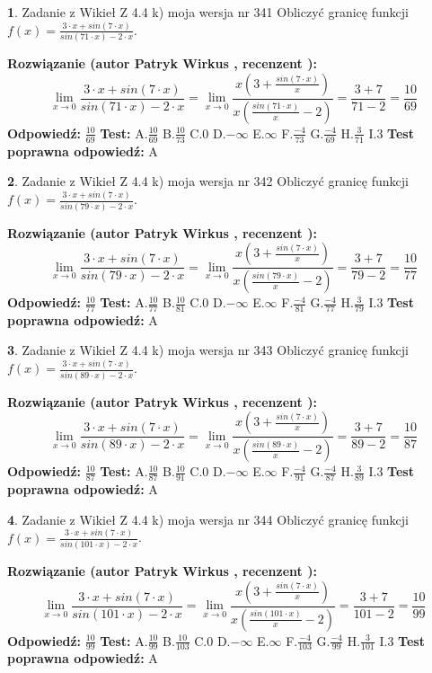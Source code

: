 \documentclass[12pt, a4paper]{article}
\theoremstyle{definition} %
\newtheorem{zad}{}
\newcommand{\zadStart}[1]{\begin{zad}#1\newline}
\newcommand{\zadStop}{\end{zad}}
\newcommand{\rozwStart}[2]{\noindent \textbf{Rozwiązanie (autor #1 , recenzent #2): }\newline}
\newcommand{\rozwStop}{\newline}
\newcommand{\odpStart}{\noindent \textbf{Odpowiedź:}\newline}
\newcommand{\odpStop}{\newline}
\newcommand{\testStart}{\noindent \textbf{Test:}\newline}
\newcommand{\testStop}{\newline}
\newcommand{\kluczStart}{\noindent \textbf{Test poprawna odpowiedź:}\newline}
\newcommand{\kluczStop}{\newline}
\begin{document}
\zadStart{Zadanie z Wikieł Z 4.4 k) moja wersja nr 341}
Obliczyć granicę funkcji $f(x)=\frac{3\cdot x +sin(7\cdot x)}{sin(71\cdot x) -2\cdot x}$.
\zadStop
\rozwStart{Patryk Wirkus}{}
$$\lim\limits_{x\to 0}\frac{3\cdot x +sin(7\cdot x)}{sin(71\cdot x) -2\cdot x}
=\lim\limits_{x\to 0}\frac{x(3+\frac{sin(7\cdot x)}{x})}{x(\frac{sin(71\cdot x)}{x}-2)}
=\frac{3+7}{71-2} = \frac{10}{69}$$
\rozwStop
\odpStart
$\frac{10}{69}$
\odpStop
\testStart
A.$\frac{10}{69}$
B.$\frac{10}{73}$
C.$0$
D.$-\infty$
E.$\infty$
F.$\frac{-4}{73}$
G.$\frac{-4}{69}$
H.$\frac{3}{71}$
I.$3$
\testStop
\kluczStart
A
\kluczStop



\zadStart{Zadanie z Wikieł Z 4.4 k) moja wersja nr 342}
Obliczyć granicę funkcji $f(x)=\frac{3\cdot x +sin(7\cdot x)}{sin(79\cdot x) -2\cdot x}$.
\zadStop
\rozwStart{Patryk Wirkus}{}
$$\lim\limits_{x\to 0}\frac{3\cdot x +sin(7\cdot x)}{sin(79\cdot x) -2\cdot x}
=\lim\limits_{x\to 0}\frac{x(3+\frac{sin(7\cdot x)}{x})}{x(\frac{sin(79\cdot x)}{x}-2)}
=\frac{3+7}{79-2} = \frac{10}{77}$$
\rozwStop
\odpStart
$\frac{10}{77}$
\odpStop
\testStart
A.$\frac{10}{77}$
B.$\frac{10}{81}$
C.$0$
D.$-\infty$
E.$\infty$
F.$\frac{-4}{81}$
G.$\frac{-4}{77}$
H.$\frac{3}{79}$
I.$3$
\testStop
\kluczStart
A
\kluczStop



\zadStart{Zadanie z Wikieł Z 4.4 k) moja wersja nr 343}
Obliczyć granicę funkcji $f(x)=\frac{3\cdot x +sin(7\cdot x)}{sin(89\cdot x) -2\cdot x}$.
\zadStop
\rozwStart{Patryk Wirkus}{}
$$\lim\limits_{x\to 0}\frac{3\cdot x +sin(7\cdot x)}{sin(89\cdot x) -2\cdot x}
=\lim\limits_{x\to 0}\frac{x(3+\frac{sin(7\cdot x)}{x})}{x(\frac{sin(89\cdot x)}{x}-2)}
=\frac{3+7}{89-2} = \frac{10}{87}$$
\rozwStop
\odpStart
$\frac{10}{87}$
\odpStop
\testStart
A.$\frac{10}{87}$
B.$\frac{10}{91}$
C.$0$
D.$-\infty$
E.$\infty$
F.$\frac{-4}{91}$
G.$\frac{-4}{87}$
H.$\frac{3}{89}$
I.$3$
\testStop
\kluczStart
A
\kluczStop



\zadStart{Zadanie z Wikieł Z 4.4 k) moja wersja nr 344}
Obliczyć granicę funkcji $f(x)=\frac{3\cdot x +sin(7\cdot x)}{sin(101\cdot x) -2\cdot x}$.
\zadStop
\rozwStart{Patryk Wirkus}{}
$$\lim\limits_{x\to 0}\frac{3\cdot x +sin(7\cdot x)}{sin(101\cdot x) -2\cdot x}
=\lim\limits_{x\to 0}\frac{x(3+\frac{sin(7\cdot x)}{x})}{x(\frac{sin(101\cdot x)}{x}-2)}
=\frac{3+7}{101-2} = \frac{10}{99}$$
\rozwStop
\odpStart
$\frac{10}{99}$
\odpStop
\testStart
A.$\frac{10}{99}$
B.$\frac{10}{103}$
C.$0$
D.$-\infty$
E.$\infty$
F.$\frac{-4}{103}$
G.$\frac{-4}{99}$
H.$\frac{3}{101}$
I.$3$
\testStop
\kluczStart
A
\kluczStop
\end{document}
